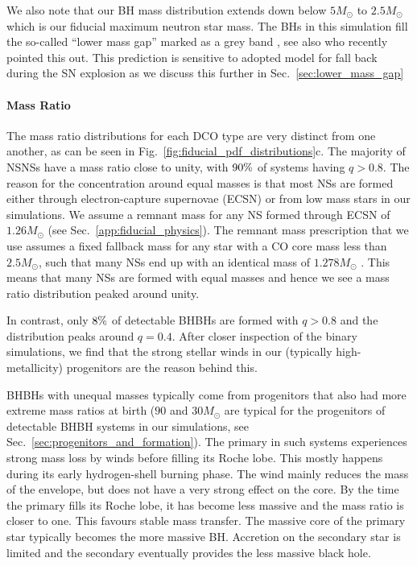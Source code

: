 We also note that our BH mass distribution extends down below $5\unit{M_{\odot}}$ to $2.5 \unit{M_{\odot}}$ which is our fiducial maximum neutron star mass. The BHs in this simulation fill the so-called ``lower mass gap'' marked as a grey band \citep{Ozel+2010,Farr+2011}, see also \citet{Shao+2021} who recently pointed this out. This prediction is sensitive to adopted model for fall back during the SN explosion as we discuss this further in Sec.~\ref{sec:lower_mass_gap}

\paragraph{Mass Ratio} The mass ratio distributions for each DCO type are very distinct from one another, as can be seen in Fig.~\ref{fig:fiducial_pdf_distributions}c. The majority of NSNSs have a mass ratio close to unity, with $90\%{}$ of systems having $q > 0.8$. The reason for the concentration around equal masses is that most NSs are formed either through electron-capture supernovae (ECSN) or from low mass stars in our simulations. We assume a remnant mass for any NS formed through ECSN of $1.26 \unit{M_{\odot}}$ (see Sec.~\ref{app:fiducial_physics}). The remnant mass prescription that we use assumes a fixed fallback mass for any star with a CO core mass less than $2.5 \unit{M_\odot}$, such that many NSs end up with an identical mass of $1.278 \unit{M_\odot}$ \citep[see][Eq.~19]{Fryer+2012}. This means that many NSs are formed with equal masses and hence we see a mass ratio distribution peaked around unity.

In contrast, only $8\%{}$ of detectable BHBHs are formed with $q > 0.8$ and the distribution peaks around $q = 0.4$. After closer inspection of the binary simulations, we find that the strong stellar winds in our (typically high-metallicity) progenitors are the reason behind this. 

BHBHs with unequal masses typically come from progenitors that also had more extreme mass ratios at birth ($90$ and $30\unit{M_{\odot}}$ are typical for the progenitors of detectable BHBH systems in our simulations, see Sec.~\ref{sec:progenitors_and_formation}). The primary in such systems experiences strong mass loss by winds before filling its Roche lobe. This mostly happens during its early hydrogen-shell burning phase. The wind mainly reduces the mass of the envelope, but does not have a very strong effect on the core. By the time the primary fills its Roche lobe, it has become less massive and the mass ratio is closer to one. This favours stable mass transfer. The massive core of the primary star typically becomes the more massive BH. Accretion on the secondary star is limited and the secondary eventually provides the less massive black hole.

